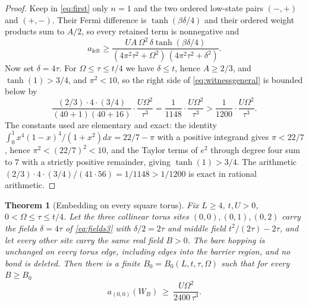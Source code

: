 \documentclass[11pt]{article}
\newtheorem{theorem}{Theorem}[section]
\theoremstyle{definition}
\theoremstyle{remark}
\begin{document}
\begin{proof}
Keep in \eqref{eq:first} only $n=1$ and the two ordered low-state pairs
$(-,+)$ and $(+,-)$. Their Fermi difference is $\tanh(\beta\delta/4)$ and their
ordered weight products sum to $A/2$, so every retained term is nonnegative and
\begin{equation}
a_{\mathrm{left}}\ge\frac{UA\,\Omega^2\,\delta\tanh(\beta\delta/4)}
{(4\pi^2\tau^2+\Omega^2)\,(4\pi^2\tau^2+\delta^2)} .
\label{eq:witnessgeneral}
\end{equation}
Now set $\delta=4\tau$. For $\Omega\le\tau\le t/4$ we have $\delta\le t$, hence
$A\ge2/3$, and $\tanh(1)>3/4$, and $\pi^2<10$, so the right side of
\eqref{eq:witnessgeneral} is bounded below by
\begin{equation}
\frac{(2/3)\cdot4\cdot(3/4)}{(40+1)(40+16)}\cdot\frac{U\Omega^2}{\tau^3}
=\frac{1}{1148}\cdot\frac{U\Omega^2}{\tau^3}
>\frac{1}{1200}\cdot\frac{U\Omega^2}{\tau^3}.
\label{eq:constant}
\end{equation}
The constants used are elementary and exact: the identity
$\int_0^1x^4(1-x)^4/(1+x^2)dx=22/7-\pi$ with a positive integrand gives $\pi<22/7$,
hence $\pi^2<(22/7)^2<10$, and the Taylor terms of $e^2$ through degree four sum to
$7$ with a strictly positive remainder, giving $\tanh(1)>3/4$. The arithmetic
$(2/3)\cdot4\cdot(3/4)/(41\cdot56)=1/1148>1/1200$ is exact in rational arithmetic.
\end{proof}

\begin{theorem}[Embedding on every square torus]
\label{thm:torus}
Fix $L\ge4$, $t,U>0$, $0<\Omega\le\tau\le t/4$. Let the three collinear torus
sites $(0,0),(0,1),(0,2)$ carry the fields $\delta=4\tau$ of \eqref{eq:fields3} with
$\delta/2=2\tau$ and middle field $t^2/(2\tau)-2\tau$, and let every other site carry
the same real field $B>0$. The bare hopping is unchanged on every torus edge,
including edges into the barrier region, and no bond is deleted. Then there is a
finite $B_0=B_0(L,t,\tau,\Omega)$ such that for every $B\ge B_0$
\begin{equation}
a_{(0,0)}(W_B)\ \ge\ \frac{U\Omega^2}{2400\,\tau^3}.
\label{eq:torus}
\end{equation}
\end{theorem}
\end{document}
